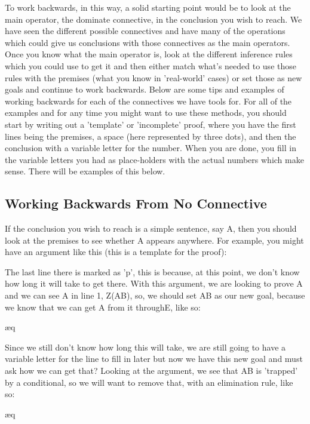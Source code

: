 To work backwards, in this way, a solid starting point would be to look at the main operator, the dominate connective, in the conclusion you wish to reach. We have seen the different possible connectives and have many of the operations which could give us conclusions with those connectives as the main operators. Once you know what the main operator is, look at the different inference rules which you could use to get it and then either match what's needed to use those rules with the premises (what you know in 'real-world' cases) or set those as new goals and continue to work backwards. Below are some tips and examples of working backwards for each of the connectives we have tools for. For all of the examples and for any time you might want to use these methods, you should start by writing out a 'template' or 'incomplete' proof, where you have the first lines being the premises, a space (here represented by three dots), and then the conclusion with a variable letter for the number. When you are done, you fill in the variable letters you had as place-holders with the actual numbers which make sense. There will be examples of this below.

\subsection{Working Backwards From No Connective}

If the conclusion you wish to reach is a simple sentence, say A, then you should look at the premises to see whether A appears anywhere. For example, you might have an argument like this (this is a template for the proof):
\begin{fitchproof}
\ellipsesline
{}
\end{fitchproof}

The last line there is marked as 'p', this is because, at this point, we don't know how long it will take to get there. With this argument, we are looking to prove A and we can see A in line 1, Z\eif (A\eand B), so, we should set A\eand B as our new goal, because we know that we can get A from it through\eand E, like so:
\begin{fitchproof}
\ellipsesline
{}
\ae{q}
\end{fitchproof}

Since we still don't know how long this will take, we are still going to have a variable letter for the line to fill in later but now we have this new goal and must ask how we can get that? Looking at the argument, we see that A\eand B is 'trapped' by a conditional, so we will want to remove that, with an elimination rule, like so: 
\begin{fitchproof}
\ellipsesline
{}
\ae{q}
\end{fitchproof}


